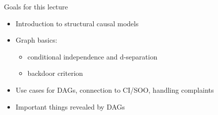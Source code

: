 \documentclass[xcolor=dvipsnames]{beamer}
\begin{document}
\begin{frame}{Goals for this lecture}
\begin{itemize}
\item<2-> Introduction to structural causal models
\bigskip
\item<3-> Graph basics: 
\begin{itemize}
\item<4-> conditional independence and d-separation
\medskip
\item<5-> backdoor criterion
\end{itemize}
\medskip
\item<6-> Use cases for DAGs, connection to CI/SOO, handling complaints
\smallskip
\item<7-> Important things revealed by DAGs
\end{itemize}
\end{frame}
\end{document}
